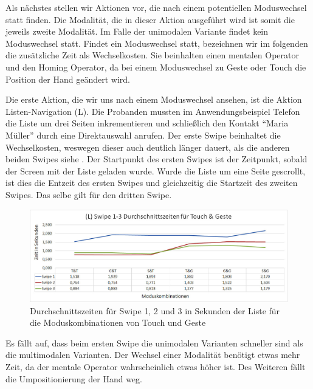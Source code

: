 Als nächstes stellen wir Aktionen vor, die nach einem potentiellen Moduswechsel statt finden. 
Die Modalität, die in dieser Aktion ausgeführt wird ist somit die jeweils zweite Modalität. 
Im Falle der unimodalen Variante findet kein Moduswechsel statt. 
Findet ein Moduswechsel statt, bezeichnen wir im folgenden die zusätzliche Zeit als Wechselkosten. 
Sie beinhalten einen mentalen Operator und den Homing Operator, da bei einem Moduswechsel zu Geste oder Touch die Position der Hand geändert wird.

Die erste Aktion, die wir uns nach einem Moduswechsel ansehen, ist die Aktion Listen-Navigation (L). 
Die Probanden mussten im Anwendungsbeispiel Telefon die Liste um drei Seiten inkrementieren und schließlich den Kontakt "`Maria Müller"' durch eine Direktauswahl anrufen. 
Der erste Swipe beinhaltet die Wechselkosten, weswegen dieser auch deutlich länger dauert, als die anderen beiden Swipes siehe . 
Der Startpunkt des ersten Swipes ist der Zeitpunkt, sobald der Screen mit der Liste geladen wurde. 
Wurde die Liste um eine Seite gescrollt, ist dies die Entzeit des ersten Swipes und gleichzeitig die Startzeit des zweiten Swipes.
Das selbe gilt für den dritten Swipe.

\begin{figure}[ht]
  \centering
  \includegraphics[width=1\textwidth]{img/Swipe1-3_Phone.JPG}
  \caption{Durchschnittszeiten für Swipe 1, 2 und 3 in Sekunden der Liste für die Moduskombinationen von Touch und Geste}
  \label{fig:Swipe13Phone}
\end{figure}

Es fällt auf, dass beim ersten Swipe die unimodalen Varianten schneller sind als die multimodalen Varianten. 
Der Wechsel einer Modalität benötigt etwas mehr Zeit, da der mentale Operator wahrscheinlich etwas höher ist.
Des Weiteren fällt die Umpositionierung der Hand weg. 

